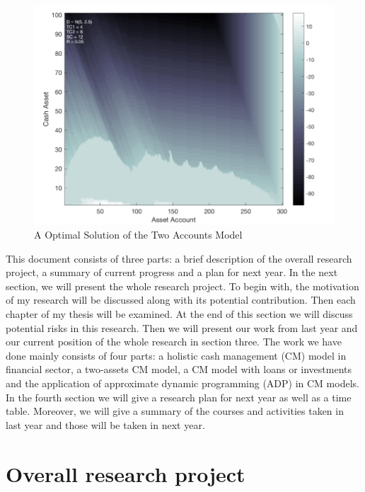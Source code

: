 \documentclass[12pt]{article}
\begin{document}
\begin{figure}
\begin{center}
\includegraphics[scale=.25]{ResultFirstYear_rdy}
\end{center}
\caption{A Optimal Solution of the Two Accounts Model}
\label{firstY}
\end{figure}

This document consists of three parts: a brief description of the overall research project, a summary of current progress and a plan for next year. In the next section, we will present the whole research project. To begin with, the motivation of my research will be discussed along with its potential contribution. Then each chapter of my thesis will be examined. At the end of this section we will discuss potential risks in this research.
Then we will present our work from last year and our current position of the whole research in section three. The work we have done mainly consists of four parts: a holistic cash management (CM) model in financial sector, a two-assets CM model, a CM model with loans or investments and the application of approximate dynamic programming (ADP) in CM models. In the fourth section we will give a research plan for next year as well as a time table. Moreover, we will give a summary of the courses and activities taken in last year and those will be taken in next year.


\section{Overall research project}
\end{document}
